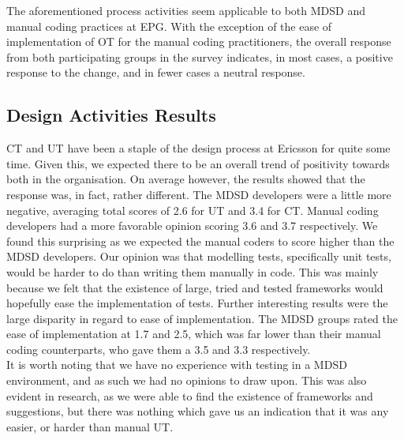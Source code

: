 \documentclass[final_report_innit.tex]{subfiles}
\begin{document}
The aforementioned process activities seem applicable to both MDSD and manual coding practices at EPG. With the exception of the ease of implementation of OT for the manual coding practitioners, the overall response from both participating groups in the survey indicates, in most cases, a positive response to the change, and in fewer cases a neutral response.

\subsection{Design Activities Results}

CT and UT have been a staple of the design process at Ericsson for quite some time. Given this, we expected there to be an overall trend of positivity towards both in the organisation. On average however, the results showed that the response was, in fact, rather different. The MDSD developers were a little more negative, averaging total scores of 2.6 for UT and 3.4 for CT. Manual coding developers had a more favorable opinion scoring 3.6 and 3.7 respectively. We found this surprising as we expected the manual coders to score higher than the MDSD developers. Our opinion was that modelling tests, specifically unit tests, would be harder to do than writing them manually in code. This was mainly because we felt that the existence of large, tried and tested frameworks would hopefully ease the implementation of tests. Further interesting results were the large disparity in regard to ease of implementation. The MDSD groups rated the ease of implementation at 1.7 and 2.5, which was far lower than their manual coding counterparts, who gave them a 3.5 and 3.3 respectively.
\\

It is worth noting that we have no experience with testing in a MDSD environment, and as such we had no opinions to draw upon. This was also evident in research, as we were able to find the existence of frameworks and suggestions, but there was nothing which gave us an indication that it was any easier, or harder than manual UT.
\\
\end{document}
